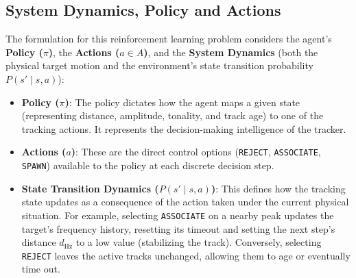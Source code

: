 \documentclass[12pt,a4paper]{article}
\begin{document}
\subsection{System Dynamics, Policy and Actions}
The formulation for this reinforcement learning problem considers the agent's \textbf{Policy ($\pi$)}, the \textbf{Actions ($a \in A$)}, and the \textbf{System Dynamics} (both the physical target motion and the environment's state transition probability $P(s' \mid s, a)$):
\begin{itemize}
    \item \textbf{Policy ($\pi$)}: The policy dictates how the agent maps a given state (representing distance, amplitude, tonality, and track age) to one of the tracking actions. It represents the decision-making intelligence of the tracker.
    \item \textbf{Actions ($a$)}: These are the direct control options (\texttt{REJECT}, \texttt{ASSOCIATE}, \texttt{SPAWN}) available to the policy at each discrete decision step.
    \item \textbf{State Transition Dynamics ($P(s' \mid s, a)$)}: This defines how the tracking state updates as a consequence of the action taken under the current physical situation. For example, selecting \texttt{ASSOCIATE} on a nearby peak updates the target's frequency history, resetting its timeout and setting the next step's distance $d_{\text{Hz}}$ to a low value (stabilizing the track). Conversely, selecting \texttt{REJECT} leaves the active tracks unchanged, allowing them to age or eventually time out.
\end{itemize}
\end{document}
